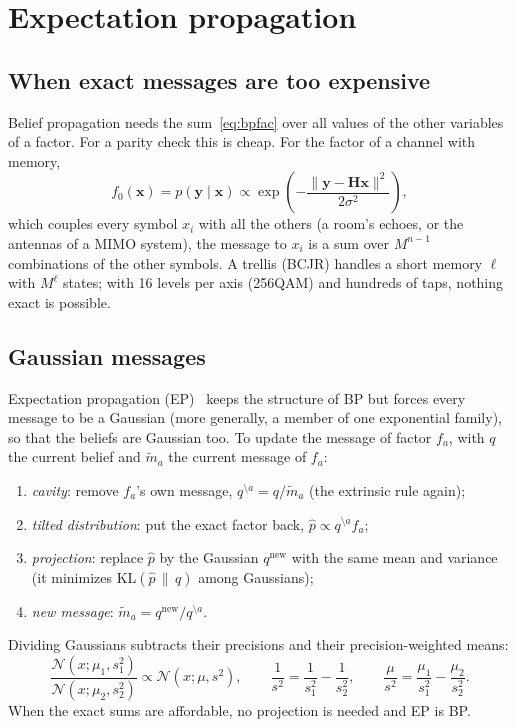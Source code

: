 \documentclass[11pt,a4paper]{article}
\newcommand{\N}{\mathcal{N}}
\theoremstyle{definition}
\theoremstyle{remark}
\begin{document}
\section{Expectation propagation}
\label{sec:ep}

\subsection{When exact messages are too expensive}

Belief propagation needs the sum~\eqref{eq:bpfac} over all values of the other variables of a factor. For a parity check this is cheap. For the factor of a channel with memory,
\begin{equation}
  f_0(\bm{x}) = p(\bm{y}\mid\bm{x}) \propto \exp\!\left(-\frac{\|\bm{y}-\bm{H}\bm{x}\|^2}{2\sigma^2}\right),
  \label{eq:linear}
\end{equation}
which couples every symbol $x_i$ with all the others (a room's echoes, or the antennas of a MIMO system), the message to $x_i$ is a sum over $M^{n-1}$ combinations of the other symbols. A trellis (BCJR) handles a short memory $\ell$ with $M^{\ell}$ states; with 16 levels per axis (256QAM) and hundreds of taps, nothing exact is possible.

\subsection{Gaussian messages}

Expectation propagation (EP)~\cite{minka} keeps the structure of BP but forces every message to be a Gaussian (more generally, a member of one exponential family), so that the beliefs are Gaussian too. To update the message of factor $f_a$, with $q$ the current belief and $\tilde m_a$ the current message of $f_a$:
\begin{enumerate}[leftmargin=*]
  \item \emph{cavity}: remove $f_a$'s own message, $q^{\setminus a} = q/\tilde m_a$ (the extrinsic rule again);
  \item \emph{tilted distribution}: put the exact factor back, $\hat p \propto q^{\setminus a} f_a$;
  \item \emph{projection}: replace $\hat p$ by the Gaussian $q^{\mathrm{new}}$ with the same mean and variance (it minimizes $\mathrm{KL}(\hat p\,\|\,q)$ among Gaussians);
  \item \emph{new message}: $\tilde m_a = q^{\mathrm{new}}/q^{\setminus a}$.
\end{enumerate}
Dividing Gaussians subtracts their precisions and their precision-weighted means:
\begin{equation}
  \frac{\N(x;\mu_1,s_1^2)}{\N(x;\mu_2,s_2^2)} \propto \N(x;\mu,s^2),\qquad
  \frac{1}{s^2} = \frac{1}{s_1^2}-\frac{1}{s_2^2},\qquad \frac{\mu}{s^2} = \frac{\mu_1}{s_1^2}-\frac{\mu_2}{s_2^2}.
  \label{eq:gdiv}
\end{equation}
When the exact sums are affordable, no projection is needed and EP is BP.
\end{document}
